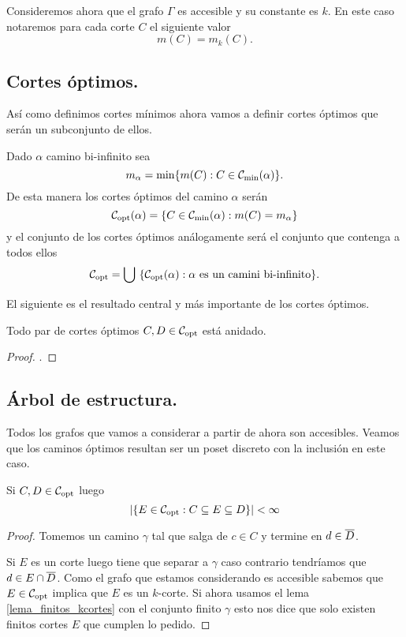 \documentclass[tesis.tex]{subfiles}
\begin{document}
Consideremos ahora que el grafo $\Gamma$ es accesible y su constante es $k$.
En este caso notaremos para cada corte $C$ el siguiente valor
\[
	m(C) = m_k(C).
\]

\subsection{Cortes óptimos.}

Así como definimos cortes mínimos ahora vamos a definir cortes óptimos que serán un subconjunto de ellos.

\begin{deff}
	Dado $\alpha$ camino bi-infinito sea
	\[
		m_\alpha = \min \{ m(C) : C \in {\cal C}_{\text{min}}(\alpha) \}.
	\]
	De esta manera los cortes óptimos del camino $\alpha$ serán
	\[
		{\cal C}_{\text{opt}}(\alpha) = \{ C \in {\cal C}_{\text{min}}(\alpha) : m(C) = m_\alpha  \}
	\]
	y el conjunto de los cortes óptimos análogamente será el conjunto que contenga a todos ellos
	\[
		{\cal C}_{\text{opt}} = \bigcup \ \{ {\cal C}_{\text{opt}}(\alpha) : \alpha \ \text{es un camini bi-infinito}  \}.
	\]
\end{deff}

El siguiente es el resultado central y más importante de los cortes óptimos.

\begin{teo}\label{teo_copt_anidados}
	Todo par de cortes óptimos $C,D \in {\cal C}_{\text{opt}}$ está anidado.
\end{teo}
\begin{proof}
	.
\end{proof}

\subsection{Árbol de estructura.}

Todos los grafos que vamos a considerar a partir de ahora son accesibles.
Veamos que los caminos óptimos resultan ser un poset discreto con la inclusión en este caso.

\begin{lema}\label{lema_intermedios}
	Si $C,D \in {\cal C}_{\text{opt}}$ luego 
	\[
	|\{ E \in {\cal C}_{\text{opt}} : C \subseteq E \subseteq D \}| < \infty
	\]
\end{lema}
\begin{proof}
	Tomemos un camino $\gamma$ tal que salga de $c \in C$ y termine en $d \in \overline D$.
	
	Si $E$ es un corte luego tiene que separar a $\gamma$ caso contrario tendríamos que $d \in E \cap \overline D$.
	Como el grafo que estamos considerando es accesible sabemos que $E \in {\cal C}_{\text{opt}}$ implica que $E$ es un $k$-corte.
	Si ahora usamos el lema \ref{lema_finitos_kcortes} con el conjunto finito $\gamma$ esto nos dice que solo existen finitos cortes $E$ que cumplen lo pedido.
\end{proof}
\end{document}
